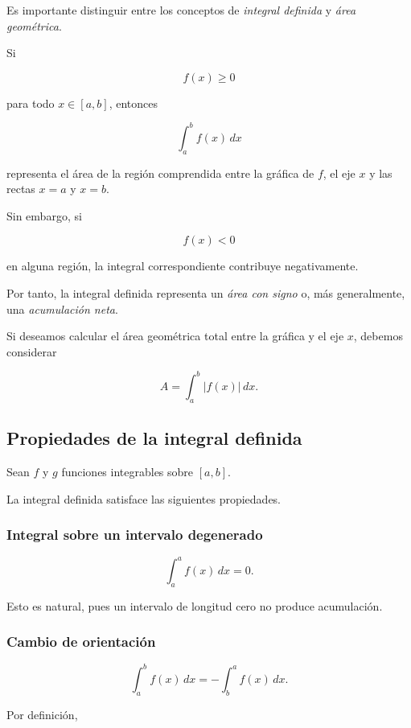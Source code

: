 \documentclass[12pt]{article}
\begin{document}
Es importante distinguir entre los conceptos de \emph{integral definida}
y \emph{área geométrica}.

Si

\[
f(x)\geq0
\]

para todo $x\in[a,b]$, entonces

\[
\int_a^b f(x)\,dx
\]

representa el área de la región comprendida entre la gráfica de $f$, el
eje $x$ y las rectas $x=a$ y $x=b$.

Sin embargo, si

\[
f(x)<0
\]

en alguna región, la integral correspondiente contribuye negativamente.

Por tanto, la integral definida representa un \emph{área con signo} o,
más generalmente, una \emph{acumulación neta}.

Si deseamos calcular el área geométrica total entre la gráfica y el eje
$x$, debemos considerar

\[
\boxed{
A=\int_a^b |f(x)|\,dx.
}
\]

\subsection{Propiedades de la integral definida}

Sean $f$ y $g$ funciones integrables sobre $[a,b]$.

La integral definida satisface las siguientes propiedades.

\subsubsection*{Integral sobre un intervalo degenerado}

\[
\boxed{
\int_a^a f(x)\,dx=0.
}
\]

Esto es natural, pues un intervalo de longitud cero no produce acumulación.


\subsubsection*{Cambio de orientación}

\[
\boxed{
\int_a^b f(x)\,dx
=
-\int_b^a f(x)\,dx.
}
\]

Por definición,
\end{document}
